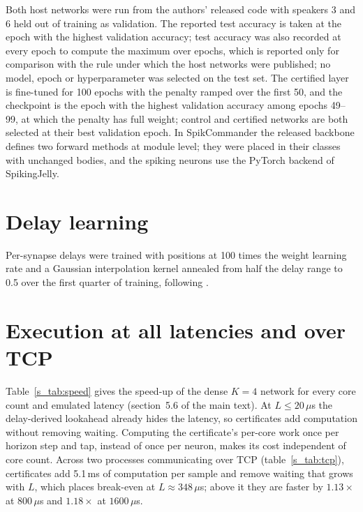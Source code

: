 \documentclass{iopjournal}
\begin{document}
Both host networks were run from the authors' released code with speakers 3 and 6 held out of training as validation. The reported test accuracy is taken at the epoch with the highest validation accuracy; test accuracy was also recorded at every epoch to compute the maximum over epochs, which is reported only for comparison with the rule under which the host networks were published; no model, epoch or hyperparameter was selected on the test set. The certified layer is fine-tuned for 100 epochs with the penalty ramped over the first 50, and the checkpoint is the epoch with the highest validation accuracy among epochs 49--99, at which the penalty has full weight; control and certified networks are both selected at their best validation epoch. In SpikCommander the released backbone defines two forward methods at module level; they were placed in their classes with unchanged bodies, and the spiking neurons use the PyTorch backend of SpikingJelly.

\section{Delay learning}

Per-synapse delays were trained with positions at 100 times the weight learning rate and a Gaussian interpolation kernel annealed from half the delay range to 0.5 over the first quarter of training, following \cite{s_dcls}.

\section{Execution at all latencies and over TCP}

Table~\ref{s_tab:speed} gives the speed-up of the dense $K=4$ network for every core count and emulated latency (section~5.6 of the main text). At $L \leq 20\,\mu$s the delay-derived lookahead already hides the latency, so certificates add computation without removing waiting. Computing the certificate's per-core work once per horizon step and tap, instead of once per neuron, makes its cost independent of core count. Across two processes communicating over TCP (table~\ref{s_tab:tcp}), certificates add 5.1\,ms of computation per sample and remove waiting that grows with $L$, which places break-even at $L\approx348\,\mu$s; above it they are faster by $1.13\times$ at $800\,\mu$s and $1.18\times$ at $1600\,\mu$s.
\end{document}
